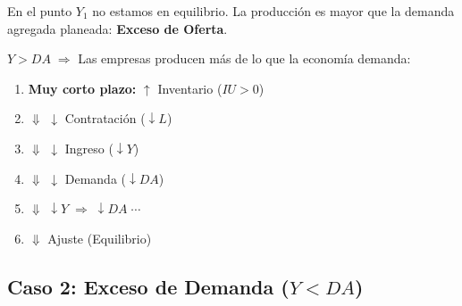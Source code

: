 \documentclass[11pt,a4paper]{article}
\begin{document}
En el punto $Y_1$ no estamos en equilibrio. La producción es mayor que la demanda agregada planeada: \textbf{Exceso de Oferta}.

$Y > DA \;\Rightarrow$ Las empresas producen más de lo que la economía demanda:

\begin{enumerate}
    \item \textbf{Muy corto plazo:} $\uparrow$ Inventario ($IU > 0$)
    \item $\Downarrow$ $\downarrow$ Contratación ($\downarrow L$)
    \item $\Downarrow$ $\downarrow$ Ingreso ($\downarrow Y$)
    \item $\Downarrow$ $\downarrow$ Demanda ($\downarrow DA$)
    \item $\Downarrow$ $\downarrow Y \;\Rightarrow\; \downarrow DA \;\cdots$
    \item $\Downarrow$ Ajuste (Equilibrio)
\end{enumerate}

\subsection{Caso 2: Exceso de Demanda ($Y < DA$)}
\end{document}

